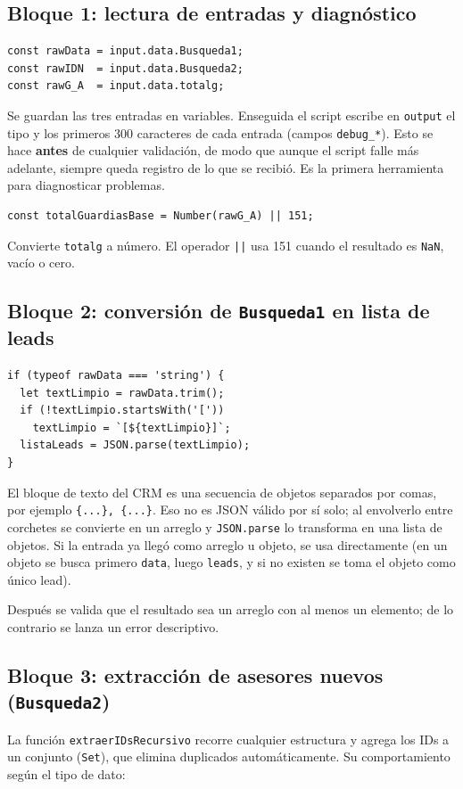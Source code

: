 \documentclass[11pt,a4paper]{article}
\newcommand{\code}[1]{\texttt{#1}}
\begin{document}
\subsection{Bloque 1: lectura de entradas y diagnóstico}
\begin{lstlisting}[style=codigo,language=JS]
const rawData = input.data.Busqueda1;
const rawIDN  = input.data.Busqueda2;
const rawG_A  = input.data.totalg;
\end{lstlisting}
Se guardan las tres entradas en variables. Enseguida el script escribe en \code{output} el tipo y los primeros 300 caracteres de cada entrada (campos \code{debug\_*}). Esto se hace \textbf{antes} de cualquier validación, de modo que aunque el script falle más adelante, siempre queda registro de lo que se recibió. Es la primera herramienta para diagnosticar problemas.

\begin{lstlisting}[style=codigo,language=JS]
const totalGuardiasBase = Number(rawG_A) || 151;
\end{lstlisting}
Convierte \code{totalg} a número. El operador \code{||} usa 151 cuando el resultado es \code{NaN}, vacío o cero.

\subsection{Bloque 2: conversión de \texttt{Busqueda1} en lista de leads}
\begin{lstlisting}[style=codigo,language=JS]
if (typeof rawData === 'string') {
  let textLimpio = rawData.trim();
  if (!textLimpio.startsWith('['))
    textLimpio = `[${textLimpio}]`;
  listaLeads = JSON.parse(textLimpio);
}
\end{lstlisting}
El bloque de texto del CRM es una secuencia de objetos separados por comas, por ejemplo \code{\{...\}, \{...\}}. Eso no es JSON válido por sí solo; al envolverlo entre corchetes se convierte en un arreglo y \code{JSON.parse} lo transforma en una lista de objetos. Si la entrada ya llegó como arreglo u objeto, se usa directamente (en un objeto se busca primero \code{data}, luego \code{leads}, y si no existen se toma el objeto como único lead).

Después se valida que el resultado sea un arreglo con al menos un elemento; de lo contrario se lanza un error descriptivo.

\subsection{Bloque 3: extracción de asesores nuevos (\texttt{Busqueda2})}
La función \code{extraerIDsRecursivo} recorre cualquier estructura y agrega los IDs a un conjunto (\code{Set}), que elimina duplicados automáticamente. Su comportamiento según el tipo de dato:
\end{document}
